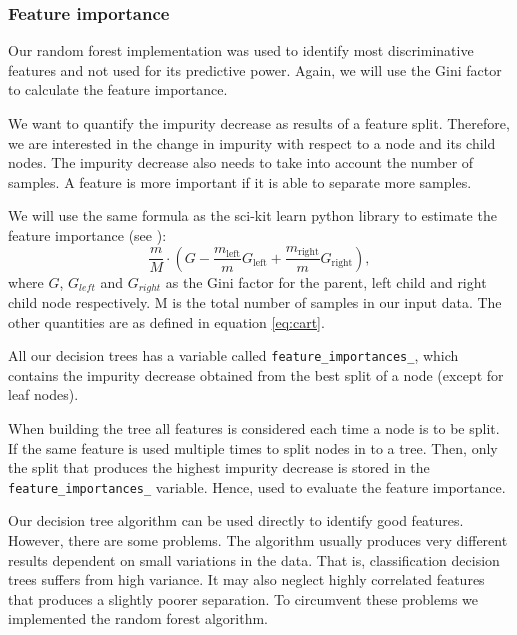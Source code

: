 \subsubsection{Feature importance} \label{sec:feature_imporance} 
Our random forest implementation was used to identify most discriminative
features and not used for its predictive power. Again, we will use the Gini
factor to calculate the feature importance. 


We want to quantify the impurity decrease as results of a feature split.
Therefore, we are interested in the change in impurity with respect to a node and its
child nodes. The impurity decrease also needs to take into account the number
of samples. A feature is more important if it is able to separate more samples.       

We will use the same formula as the sci-kit learn python library 
to estimate the feature importance (see \cite{sklearn}): 
\begin{equation*}
    \frac{m}{M} \cdot (G  - \frac{m_{\text{left}} }{m} G_{\text{left}}+
    \frac{m_{\text{right}} }{m} G_{\text{right}}), 
\end{equation*}
where $G$, $G_{left} $ and $G_{right} $ as the Gini factor for the parent,
left child and right child node respectively. M is the total number of samples
in our input data. The other quantities are as defined in equation
\ref{eq:cart}. 

All our decision trees has a variable called \verb|feature_importances_|, which
contains the impurity decrease obtained from the best split of a node (except
for leaf nodes).   

When building the tree all features is considered each time a node is to be
split. If the same feature is used multiple times to split nodes in to a tree.
Then, only the split that produces the highest impurity decrease is stored in
the \verb|feature_importances_| variable. Hence, used to evaluate the feature
importance.      



Our decision tree algorithm can be used directly to identify good features.
However, there are some problems. The algorithm usually produces very different
results dependent on small variations in the data. That is, classification
decision trees suffers from high variance. It may also neglect highly
correlated features that produces a slightly poorer separation. To circumvent
these problems we implemented the random forest algorithm. 


